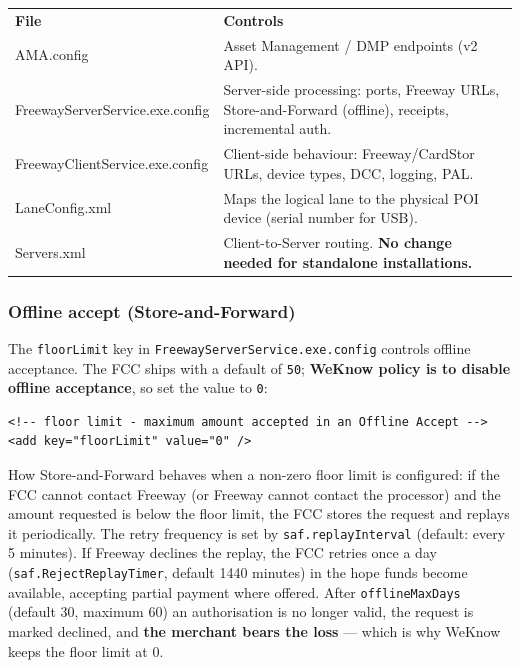 \documentclass[a4paper,10pt]{article}
\begin{document}
\begin{center}
\renewcommand{\arraystretch}{1.3}\small
\begin{tabularx}{\textwidth}{L{52mm} X}
\color{white}\textbf{File} &
\color{white}\textbf{Controls}\\
\ttfamily AMA.config & Asset Management / DMP endpoints (v2 API).\\
\ttfamily FreewayServerService.exe.config &
Server-side processing: ports, Freeway URLs, Store-and-Forward
(offline), receipts, incremental auth.\\
\ttfamily FreewayClientService.exe.config &
Client-side behaviour: Freeway/CardStor URLs, device types, DCC,
logging, PAL.\\
\ttfamily LaneConfig.xml &
Maps the logical lane to the physical POI device (serial number for
USB).\\
\ttfamily Servers.xml &
Client-to-Server routing. \textbf{No change needed for standalone
installations.}\\
\end{tabularx}
\end{center}

\subsubsection{Offline accept (Store-and-Forward)}

The \texttt{floorLimit} key in \texttt{FreewayServerService.exe.config}
controls offline acceptance. The FCC ships with a default of
\texttt{50}; \textbf{WeKnow policy is to disable offline acceptance}, so
set the value to \texttt{0}:

\begin{lstlisting}
<!-- floor limit - maximum amount accepted in an Offline Accept -->
<add key="floorLimit" value="0" />
\end{lstlisting}

How Store-and-Forward behaves when a non-zero floor limit is configured:
if the FCC cannot contact Freeway (or Freeway cannot contact the
processor) and the amount requested is below the floor limit, the FCC
stores the request and replays it periodically. The retry frequency is
set by \texttt{saf.replayInterval} (default: every 5 minutes). If Freeway
declines the replay, the FCC retries once a day
(\texttt{saf.RejectReplayTimer}, default 1440 minutes) in the hope funds
become available, accepting partial payment where offered. After
\texttt{offlineMaxDays} (default 30, maximum 60) an authorisation is no
longer valid, the request is marked declined, and \textbf{the merchant
bears the loss} --- which is why WeKnow keeps the floor limit at 0.
\end{document}
